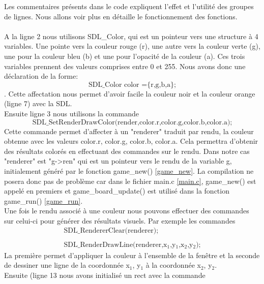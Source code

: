 \documentclass[a4paper,10p]{report}
\begin{document}
Les commentaires présents dans le code expliquent l'effet et l'utilité des groupes de lignes. Nous allons voir plus en détaille le fonctionnement des fonctions.
\\\\
A la ligne \textcolor{gris}{2} nous utilisons SDL\_Color, qui est un pointeur vers une structure à 4 variables. Une pointe vers la couleur rouge (r), une autre vers la couleur verte (g), une pour la couleur bleu (b) et une pour l’opacité de la couleur (a). Ces trois variables prennent des valeurs comprises entre 0 et 255. Nous avons donc une déclaration de la forme:
\begin{equation*}
    \text{SDL\_Color color =\{r,g,b,a\};}
\end{equation*}.
Cette affectation nous permet d'avoir facile la couleur noir et la couleur orange (ligne \textcolor{gris}{7}) avec la SDL.
\\Ensuite ligne \textcolor{gris}{3} nous utilisons la commande 
\begin{equation*}
    \text{SDL\_SetRenderDrawColor(render,color.r,color.g,color.b,color.a);}
\end{equation*}
Cette commande permet d'affecter à un "renderer" traduit par rendu, la couleur obtenue avec les valeurs color.r, color.g, color.b, color.a. Cela permettra d'obtenir des résultats colorés en effectuant des commandes sur le rendu. Dans notre cas "renderer" est "g->ren" qui est un pointeur vers le rendu de la variable g, initialement généré par le fonction game\_new() \ref{game_new}. La compilation ne posera donc pas de problème car dans le fichier main.c \ref{main.c}, game\_new() est appelé en premiers et game\_board\_update() est utilisé dans la fonction game\_run() \ref{game_run}.
\\Une fois le rendu associé à une couleur nous pouvons effectuer des commandes sur celui-ci pour générer des résultats visuels. Par exemple les commandes 
\begin{equation*}
\begin{split}
    \text{SDL\_RendererClear(renderer);}
    \\
    \\
    \text{SDL\_RenderDrawLine(renderer,x$_1$,y$_1$,x$_2$,y$_2$);} 
\end{split}
\end{equation*}
La première permet d'appliquer la couleur à l'ensemble de la fenêtre et la seconde de dessiner une ligne de la coordonnée x$_1$, y$_1$ à la coordonnée x$_2$, y$_2$.
\\Ensuite (ligne \textcolor{gris}{13} nous avons initialisé un rect avec la commande 
\end{document}
